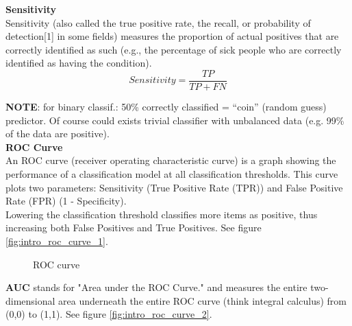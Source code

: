 \documentclass[../main.tex]{subfiles}
\begin{document}
\noindent\textbf{Sensitivity}\\
Sensitivity (also called the true positive rate, the recall, or probability of detection[1] in some fields) measures the proportion of actual positives that are correctly identified as such (e.g., the percentage of sick people who are correctly identified as having the condition).
$$ Sensitivity = \frac{TP}{TP + FN}$$

\textbf{NOTE}: for binary classif.: 50\% correctly classified = “coin” (random guess) predictor. Of course could exists trivial classifier with unbalanced data (e.g. 99\% of the data are positive).\\

\noindent\textbf{ROC Curve}\\
An ROC curve (receiver operating characteristic curve) is a graph showing the performance of a classification model at all classification thresholds. This curve plots two parameters: Sensitivity (True Positive Rate (TPR)) and False Positive Rate (FPR) (1 - Specificity).\\

Lowering the classification threshold classifies more items as positive, thus increasing both False Positives and True Positives. See figure \ref{fig:intro_roc_curve_1}.

\begin{figure}[H]
  \centering
  \hfill
  \caption{ROC curve}
\end{figure}
\textbf{AUC} stands for "Area under the ROC Curve." and measures the entire two-dimensional area underneath the entire ROC curve (think integral calculus) from (0,0) to (1,1). See figure \ref{fig:intro_roc_curve_2}.\\
\end{document}
